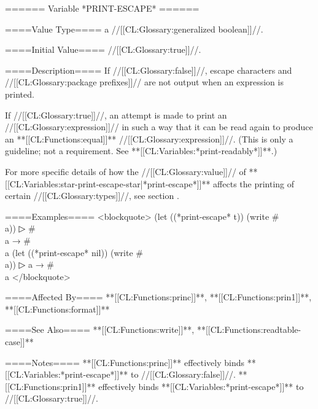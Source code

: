 ====== Variable *PRINT-ESCAPE* ======

====Value Type====
a //[[CL:Glossary:generalized boolean]]//.

====Initial Value====
//[[CL:Glossary:true]]//.

====Description====
If //[[CL:Glossary:false]]//, escape characters and //[[CL:Glossary:package prefixes]]// are not output when an expression is printed.


If //[[CL:Glossary:true]]//, an attempt is made to print an //[[CL:Glossary:expression]]// in such a way that it can be read again to produce an **[[CL:Functions:equal]]** //[[CL:Glossary:expression]]//. (This is only a guideline; not a requirement. See **[[CL:Variables:*print-readably*]]**.)

For more specific details of how the //[[CL:Glossary:value]]// of **[[CL:Variables:star-print-escape-star|*print-escape*]]** affects the printing of certain //[[CL:Glossary:types]]//, see section {\secref\DefaultPrintObjMeths}.

====Examples==== <blockquote> (let ((*print-escape* t)) (write #\\a))
▷ #\\a → #\\a (let ((*print-escape* nil)) (write #\\a))
▷ a → #\\a </blockquote>

====Affected By====
**[[CL:Functions:princ]]**, **[[CL:Functions:prin1]]**, **[[CL:Functions:format]]**

====See Also====
**[[CL:Functions:write]]**, **[[CL:Functions:readtable-case]]**

====Notes====
**[[CL:Functions:princ]]** effectively binds **[[CL:Variables:*print-escape*]]** to //[[CL:Glossary:false]]//. **[[CL:Functions:prin1]]** effectively binds **[[CL:Variables:*print-escape*]]** to //[[CL:Glossary:true]]//.


